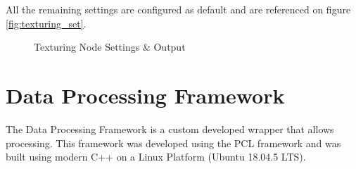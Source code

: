 \documentclass[12pt]{report}
\begin{document}
All the remaining settings are configured as default and are referenced on figure \ref{fig:texturing_set}.
\begin{figure}[H]%
  \centering
  \qquad
\caption{Texturing Node Settings \& Output}
\label{fig:Texturing_settings} 
\end{figure}



\section{Data Processing Framework}
\label{Section:data_framework}
The Data Processing Framework is a custom developed wrapper that allows processing.
This framework was developed using the PCL framework and was built using modern C++ on a Linux Platform (Ubuntu 18.04.5 LTS). 
\end{document}
